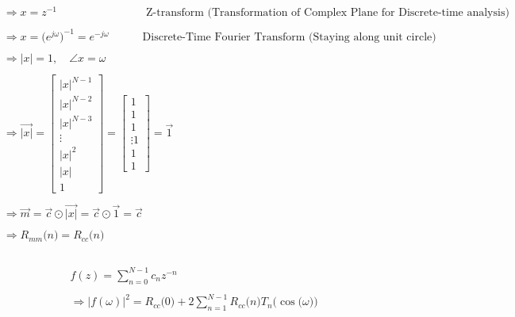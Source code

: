 \documentclass{article}
\begin{document}
\begin{align*}
    & \Rightarrow x = z^{-1} \quad \quad \quad \quad \quad \quad \quad \quad \text{Z-transform (Transformation of Complex Plane for Discrete-time analysis)} \\ \\
    & \Rightarrow x = \big(e^{j\omega}\big)^{-1} = e^{-j\omega} \quad \quad \quad \text{Discrete-Time Fourier Transform (Staying along unit circle)} \\ \\
    & \Rightarrow |x| = 1, \quad \angle{x} = \omega \\ \\
    & \Rightarrow \vec{|x|} = \begin{bmatrix}
                                    |x|^{N - 1} \\
                                    |x|^{N - 2} \\
                                    |x|^{N - 3} \\
                                    \vdots \\
                                    |x|^{2} \\
                                    |x| \\
                                    1
                                \end{bmatrix}
                            = \begin{bmatrix}
                                    1 \\
                                    1 \\
                                    1 \\
                                    \vdots
                                    1 \\
                                    1 \\
                                    1
                                \end{bmatrix} = \vec{1} \\ \\
    & \Rightarrow \vec{m} = \vec{c} \odot \vec{|x|} = \vec{c} \odot \vec{1} = \vec{c} \\ \\
    & \Rightarrow R_{mm}\big(n\big) = R_{cc}\big(n\big)
\end{align*}

\begin{align*}
    & \\ \\
    & f(z) = \sum_{n = 0}^{N - 1}c_{n}z^{-n} \\ \\
    &\Rightarrow |f(\omega)|^{2} = R_{cc}\big(0\big) + 2\sum_{n=1}^{N - 1}R_{cc}\big(n\big)T_{n}\Big(\cos\big(\omega\big)\Big) 
\end{align*}
\end{document}
